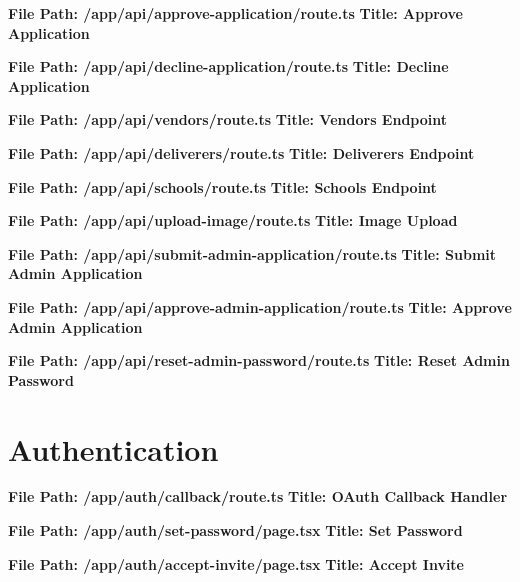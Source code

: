 \documentclass[12pt,a4paper]{book}
\begin{document}
\noindent\textbf{File Path: /app/api/approve-application/route.ts}
\noindent\textbf{Title: Approve Application}


\noindent\textbf{File Path: /app/api/decline-application/route.ts}
\noindent\textbf{Title: Decline Application}


\noindent\textbf{File Path: /app/api/vendors/route.ts}
\noindent\textbf{Title: Vendors Endpoint}


\noindent\textbf{File Path: /app/api/deliverers/route.ts}
\noindent\textbf{Title: Deliverers Endpoint}


\noindent\textbf{File Path: /app/api/schools/route.ts}
\noindent\textbf{Title: Schools Endpoint}


\noindent\textbf{File Path: /app/api/upload-image/route.ts}
\noindent\textbf{Title: Image Upload}


\noindent\textbf{File Path: /app/api/submit-admin-application/route.ts}
\noindent\textbf{Title: Submit Admin Application}


\noindent\textbf{File Path: /app/api/approve-admin-application/route.ts}
\noindent\textbf{Title: Approve Admin Application}


\noindent\textbf{File Path: /app/api/reset-admin-password/route.ts}
\noindent\textbf{Title: Reset Admin Password}


\section{Authentication}

\noindent\textbf{File Path: /app/auth/callback/route.ts}
\noindent\textbf{Title: OAuth Callback Handler}


\noindent\textbf{File Path: /app/auth/set-password/page.tsx}
\noindent\textbf{Title: Set Password}


\noindent\textbf{File Path: /app/auth/accept-invite/page.tsx}
\noindent\textbf{Title: Accept Invite}

\end{document}
